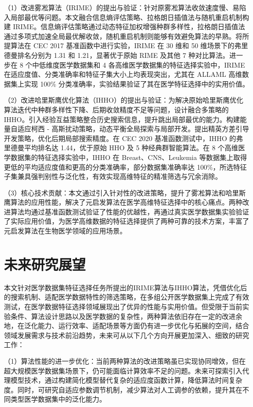 \documentclass{wzuthesis}
\begin{document}
（1）改进雾凇算法（IRIME）的提出与验证：针对原雾凇算法收敛速度慢、易陷入局部最优等问题。本文融合信息熵评估策略、拉格朗日插值法与随机重启机制构建 IRIME。信息熵评估策略通过动态特征加权增强种群多样性，拉格朗日插值法通过多项式加速全局最优解收敛，随机重启机制则能够有效避免算法的早熟。将所提算法在 CEC 2017 基准函数中进行实验，IRIME 在 30 维和 50 维场景下的弗里德曼排名分别为 1.31 和 1.21，显著优于原始 RIME 及其他 7 种对比算法。进一步在 8 个中低维度医学数据集和 4 各高维医学数据集的特征选择实验中，IRIME 在适应度值、分类准确率和特征子集大小上均表现突出，尤其在 ALLAML 高维数据集上实现 100\% 分类准确率，实验结果验证了其在医学特征选择中的实用价值。

（2）改进哈里斯鹰优化算法（IHHO）的提出与验证：为解决原始哈里斯鹰优化算法迭代中种群多样性下降、后期收敛精度不足等问题，设计融合多策略的 IHHO。引入经验互益策略整合历史搜索信息，提升跳出局部最优的能力。构建能量自适应柯西 - 高斯扰动策略，动态平衡全局探索与局部开发。提出精英方差引导开发策略，优化后期局部搜索精度。在 CEC 2020 基准函数测试中，IHHO 的弗里德曼平均排名达 1.44，优于原始 HHO 及 5 种经典群智能算法。在 8 个高维医学数据集的特征选择实验中，IHHO 在 Breast、CNS、Leukemia 等数据集上取得更低的平均适应度值和更高的分类准确率，部分数据集准确率达 100\%，所选特征子集兼具强判别性与泛化性，有效实现高维特征的精准筛选与冗余消除。

（3）核心技术贡献：本文通过引入针对性的改进策略，提升了雾凇算法和哈里斯鹰算法的应用性能，解决了元启发算法在医学高维特征选择中的核心痛点。两种改进算法均通过基准函数测试验证了性能的优越性，再通过真实医学数据集实验验证了实际应用价值，为医学高维数据的特征选择提供了两种可靠的技术方案，丰富了元启发算法在生物医学领域的应用场景。

\section{未来研究展望}

本文针对医学数据集特征选择任务所提出的IRIME算法与IHHO算法，凭借优化后的搜索机制、适配医学数据特性的筛选策略，在多组公开医学数据集上完成了有效测试，在医学数据特征选择领域展现出了优异的性能与实用价值。但受限于当前实验条件、算法设计思路以及医学数据的复杂性，两种算法依旧存在一定的改进余地，在泛化能力、运行效率、适配场景等方面仍有进一步优化与拓展的空间，结合领域发展需求与技术前沿趋势，未来可从以下几个方向开展更加深入、细致的研究工作：

（1）算法性能的进一步优化：当前两种算法的改进策略虽已实现协同增效，但在超大规模医学数据集场景下，仍可能面临计算效率不足的问题。未来可探索引入代理模型技术，通过构建简化模型替代复杂的适应度函数计算，降低算法时间复杂度。同时，可研究自适应参数调节机制，减少算法对人工调参的依赖，提升其在不同类型医学数据集中的泛化能力。
\end{document}
